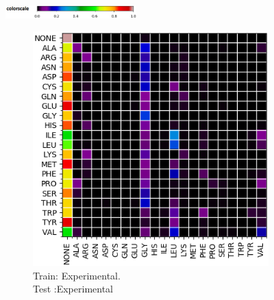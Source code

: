 \begin{figure}[!ht]

\includegraphics[width=0.45\textwidth]{pics/scale.png}

\begin{minipage}[b]{0.49\linewidth}
\begin{subfigure}[b]{\linewidth}
	\includegraphics[width=1.\textwidth]{pics/CM_22_RR.png}
	\caption{\scriptsize
	Train: Experimental. \\
	Test :Experimental}
	\label{f:CM_22_RR}
\end{subfigure}
\end{minipage}
\begin{minipage}[b]{0.49\linewidth}
\begin{subfigure}[b]{\linewidth}

\end{subfigure}
\end{minipage}
\end{figure}
